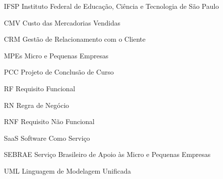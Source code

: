 \begin{siglas}
  \item[IFSP] Instituto Federal de Educação, Ciência e Tecnologia de São Paulo
  \item[CMV] Custo das Mercadorias Vendidas 
  \item[CRM] Gestão de Relacionamento com o Cliente
  \item[MPEs] Micro e Pequenas Empresas
  \item[PCC] Projeto de Conclusão de Curso
  \item[RF] Requisito Funcional
  \item[RN] Regra de Negócio
  \item[RNF] Requisito Não Funcional
  \item[SaaS] Software Como Serviço
  \item[SEBRAE] Serviço Brasileiro de Apoio às Micro e Pequenas Empresas
  \item[UML] Linguagem de Modelagem Unificada 
\end{siglas}